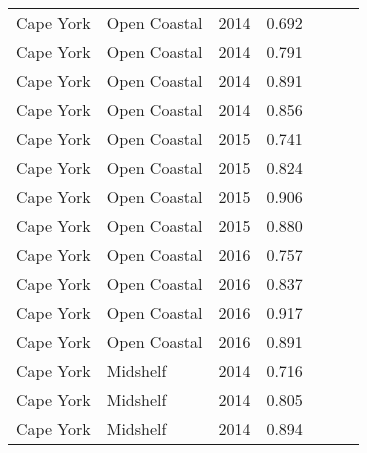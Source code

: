 {\begin{longtable}{llccccc}
\endhead Cape York & Open Coastal & 2014 & 0.692 & \cellcolor[HTML]{B0D235}{B} & \cellcolor[HTML]{B0D235}{B} & \cellcolor[HTML]{B0D235}{B} \\ 
  Cape York & Open Coastal & 2014 & 0.791 & \cellcolor[HTML]{B0D235}{B} & \cellcolor[HTML]{B0D235}{B} & \cellcolor[HTML]{B0D235}{B} \\ 
  Cape York & Open Coastal & 2014 & 0.891 & \cellcolor[HTML]{00734D}{A} & \cellcolor[HTML]{00734D}{A} & \cellcolor[HTML]{00734D}{A} \\ 
  Cape York & Open Coastal & 2014 & 0.856 & \cellcolor[HTML]{00734D}{A} & \cellcolor[HTML]{00734D}{A} & \cellcolor[HTML]{00734D}{A} \\ 
  Cape York & Open Coastal & 2015 & 0.741 & \cellcolor[HTML]{B0D235}{B} & \cellcolor[HTML]{B0D235}{B} & \cellcolor[HTML]{B0D235}{B} \\ 
  Cape York & Open Coastal & 2015 & 0.824 & \cellcolor[HTML]{B0D235}{B} & \cellcolor[HTML]{00734D}{A} & \cellcolor[HTML]{B0D235}{B} \\ 
  Cape York & Open Coastal & 2015 & 0.906 & \cellcolor[HTML]{00734D}{A} & \cellcolor[HTML]{00734D}{A} & \cellcolor[HTML]{00734D}{A} \\ 
  Cape York & Open Coastal & 2015 & 0.880 & \cellcolor[HTML]{00734D}{A} & \cellcolor[HTML]{00734D}{A} & \cellcolor[HTML]{00734D}{A} \\ 
  Cape York & Open Coastal & 2016 & 0.757 & \cellcolor[HTML]{B0D235}{B} & \cellcolor[HTML]{B0D235}{B} & \cellcolor[HTML]{B0D235}{B} \\ 
  Cape York & Open Coastal & 2016 & 0.837 & \cellcolor[HTML]{00734D}{A} & \cellcolor[HTML]{00734D}{A} & \cellcolor[HTML]{B0D235}{B} \\ 
  Cape York & Open Coastal & 2016 & 0.917 & \cellcolor[HTML]{00734D}{A} & \cellcolor[HTML]{00734D}{A} & \cellcolor[HTML]{00734D}{A} \\ 
  Cape York & Open Coastal & 2016 & 0.891 & \cellcolor[HTML]{00734D}{A} & \cellcolor[HTML]{00734D}{A} & \cellcolor[HTML]{00734D}{A} \\ 
  Cape York & Midshelf & 2014 & 0.716 & \cellcolor[HTML]{B0D235}{B} & \cellcolor[HTML]{B0D235}{B} & \cellcolor[HTML]{B0D235}{B} \\ 
  Cape York & Midshelf & 2014 & 0.805 & \cellcolor[HTML]{B0D235}{B} & \cellcolor[HTML]{00734D}{A} & \cellcolor[HTML]{B0D235}{B} \\ 
  Cape York & Midshelf & 2014 & 0.894 & \cellcolor[HTML]{00734D}{A} & \cellcolor[HTML]{00734D}{A} & \cellcolor[HTML]{00734D}{A} \\ 

\end{longtable}}
